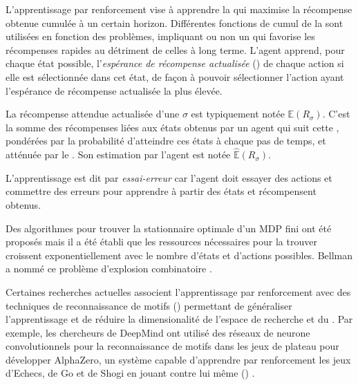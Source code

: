 L'apprentissage par renforcement vise à apprendre la  qui maximise la récompense obtenue cumulée à un certain horizon. 
Différentes fonctions de cumul de la  sont utilisées en fonction des problèmes, impliquant ou non un  qui favorise les récompenses rapides au détriment de celles à long terme.  
L'agent apprend, pour chaque état possible, l'\emph{espérance de récompense actualisée} () de chaque action si elle est sélectionnée dans cet état, de façon à pouvoir sélectionner l'action ayant l'espérance de récompense actualisée la plus élevée. 

La récompense attendue actualisée d'une  $\sigma$ est typiquement notée $\mathbb{E}(R_\sigma)$.
C'est la somme des récompenses liées aux états obtenus par un agent qui suit cette , pondérées par la probabilité d'atteindre ces états à chaque pas de temps, et \og atténuée \fg par le . 
Son estimation par l'agent est notée $\hat{\mathbb{E}}(R_\sigma)$.

L'apprentissage est dit par \emph{essai-erreur} car l'agent doit essayer des actions et commettre des erreurs pour apprendre à partir des états et récompensent obtenus. 

Des algorithmes pour trouver la  stationnaire optimale d'un MDP fini ont été proposés \cite{ross_introduction_1983} mais il a été établi que les ressources nécessaires pour la trouver croissent exponentiellement avec le nombre d'états et d'actions possibles.
Bellman a nommé ce problème d'explosion combinatoire .

Certaines recherches actuelles associent l'apprentissage par renforcement avec des techniques de reconnaissance de motifs () permettant de généraliser l'apprentissage et de réduire la dimensionalité de l'espace de recherche et du . 
Par exemple, les chercheurs de DeepMind ont utilisé des réseaux de neurone convolutionnels pour la reconnaissance de motifs dans les jeux de plateau pour développer AlphaZero, un système capable d'apprendre par renforcement les jeux d'Echecs, de Go et de Shogi en jouant contre lui même () \cite{silver_general_2018}.

